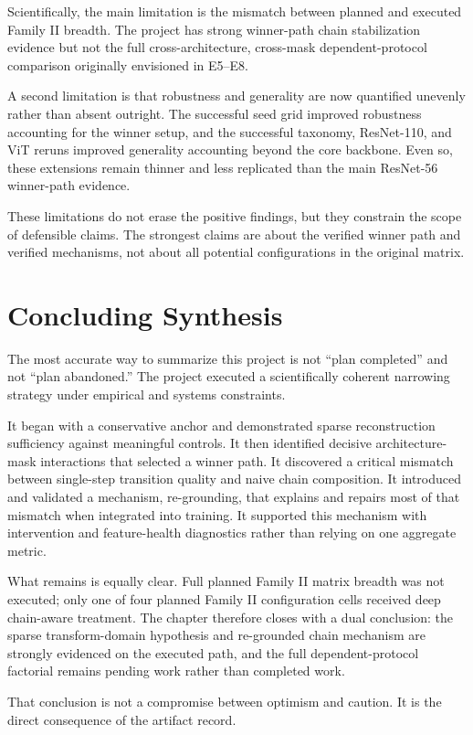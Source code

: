 \documentclass[11pt]{article}
\begin{document}
Scientifically, the main limitation is the mismatch between planned and executed Family II breadth. The project has strong winner-path chain stabilization evidence but not the full cross-architecture, cross-mask dependent-protocol comparison originally envisioned in E5--E8.

A second limitation is that robustness and generality are now quantified unevenly rather than absent outright. The successful seed grid improved robustness accounting for the winner setup, and the successful taxonomy, ResNet-110, and ViT reruns improved generality accounting beyond the core backbone. Even so, these extensions remain thinner and less replicated than the main ResNet-56 winner-path evidence.

These limitations do not erase the positive findings, but they constrain the scope of defensible claims. The strongest claims are about the verified winner path and verified mechanisms, not about all potential configurations in the original matrix.

\section{Concluding Synthesis}
The most accurate way to summarize this project is not ``plan completed'' and not ``plan abandoned.'' The project executed a scientifically coherent narrowing strategy under empirical and systems constraints.

It began with a conservative anchor and demonstrated sparse reconstruction sufficiency against meaningful controls. It then identified decisive architecture-mask interactions that selected a winner path. It discovered a critical mismatch between single-step transition quality and naive chain composition. It introduced and validated a mechanism, re-grounding, that explains and repairs most of that mismatch when integrated into training. It supported this mechanism with intervention and feature-health diagnostics rather than relying on one aggregate metric.

What remains is equally clear. Full planned Family II matrix breadth was not executed; only one of four planned Family II configuration cells received deep chain-aware treatment. The chapter therefore closes with a dual conclusion: the sparse transform-domain hypothesis and re-grounded chain mechanism are strongly evidenced on the executed path, and the full dependent-protocol factorial remains pending work rather than completed work.

That conclusion is not a compromise between optimism and caution. It is the direct consequence of the artifact record.
\end{document}
